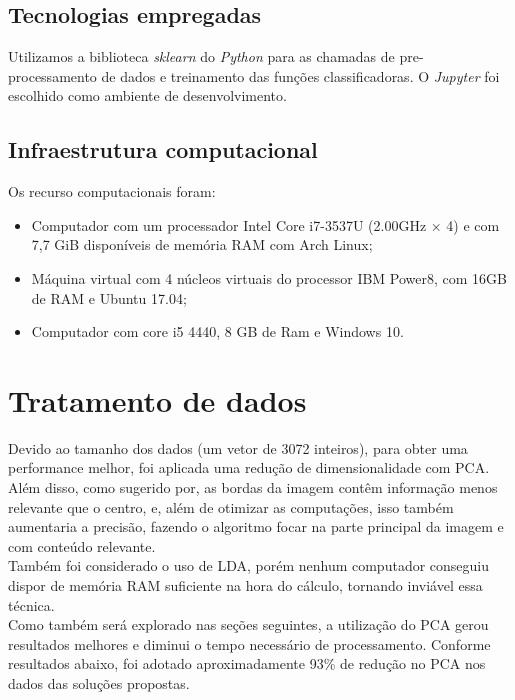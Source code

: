 \documentclass[conference]{IEEEtran}
\begin{document}
\subsection{Tecnologias empregadas}
Utilizamos a biblioteca \textit{sklearn}\cite{b8} do \textit{Python} para as chamadas de pre-processamento de dados e treinamento das funções classificadoras. O \textit{Jupyter} foi escolhido como ambiente de desenvolvimento.

\subsection{Infraestrutura computacional}
Os recurso computacionais foram:

\begin{itemize}
\item Computador com um processador Intel Core i7-3537U (2.00GHz × 4) e com 7,7 GiB disponíveis de memória RAM com Arch Linux;

\item Máquina virtual com 4 núcleos virtuais do processor IBM Power8, com 16GB de RAM e  Ubuntu 17.04;

\item Computador com core i5 4440, 8 GB de Ram e Windows 10.

\end{itemize}

\section{Tratamento de dados}

Devido ao tamanho dos dados (um vetor de 3072 inteiros), para obter uma performance melhor, foi aplicada uma redução de dimensionalidade com PCA\cite{b9}. Além disso, como sugerido por\cite{b10}, as bordas da imagem contêm informação menos relevante que o centro, e, além de otimizar as computações, isso também aumentaria a precisão, fazendo o algoritmo focar na parte principal da imagem e com conteúdo relevante.\\
Também foi considerado o uso de LDA, porém nenhum computador conseguiu dispor de memória RAM suficiente na hora do cálculo, tornando inviável essa técnica.\\
Como também será explorado nas seções seguintes, a utilização do PCA gerou resultados melhores e diminui o tempo necessário de processamento. Conforme resultados abaixo, foi adotado aproximadamente 93\% de redução no PCA nos dados das soluções propostas.
\end{document}
